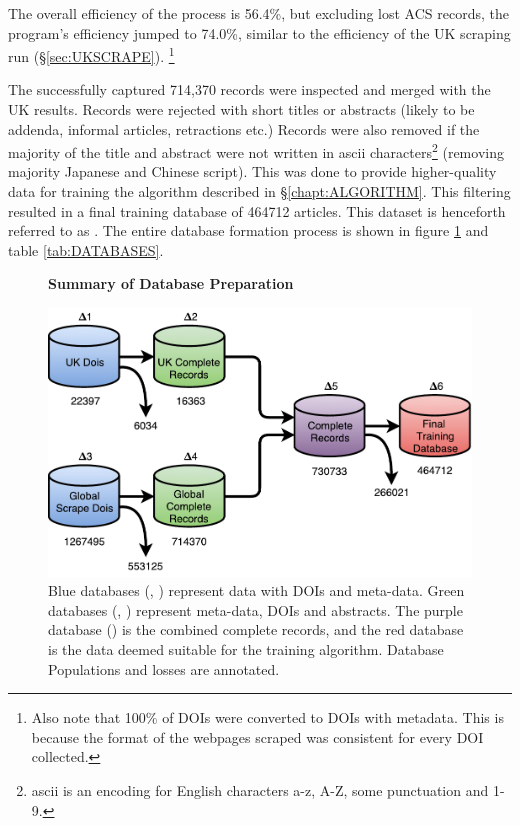 The overall efficiency of the process is 56.4\%, but excluding lost ACS records, the program's efficiency jumped to 74.0\%, similar to the efficiency of the UK scraping run (\S\ref{sec:UKSCRAPE}). \footnote{Also note that 100\% of DOIs were converted to DOIs with metadata. This is because the format of the webpages scraped was consistent for every DOI collected.}

The successfully captured 714,370 records were inspected and merged with the UK results. Records were rejected with short titles or abstracts (likely to be addenda, informal articles, retractions etc.) Records were also removed if the majority of the title and abstract were not written in ascii characters\footnote{ascii is an encoding for English characters a-z, A-Z, some punctuation and 1-9.} (removing majority Japanese and Chinese script). This was done to provide higher-quality data for training the algorithm described in  \S\ref{chapt:ALGORITHM}. This filtering resulted in a final training database of 464712 articles. This dataset is henceforth referred to as . The entire database formation process is shown in figure \ref{fig:DATABASES} and table \ref{tab:DATABASES}.
\begin{figure}[H]
    \centering
    \textbf{Summary of Database Preparation}\par\medskip
    \includegraphics[scale=0.6]{Data_Acquisition/Databases2.pdf}
    \caption[Summary of Database Preparation]{Blue databases (, ) represent data with DOIs and meta-data. Green databases (,  ) represent meta-data, DOIs and abstracts. The purple database () is the combined complete records, and the red database is the data deemed suitable for the training algorithm. Database Populations and losses are annotated.}
     \label{fig:DATABASES}
\end{figure}
